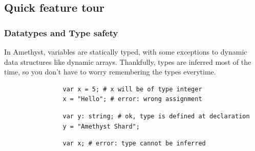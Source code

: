 \documentclass[12pt]{article}
\begin{document}
    \subsection{Quick feature tour}
        \subsubsection{Datatypes and Type safety}
            In Amethyst, variables are statically typed, with some exceptions to dynamic data structures like dynamic arrays. Thankfully, types are inferred most of the time, so you don't have to worry remembering the types everytime.
            
            \begin{lstlisting}
                var x = 5; # x will be of type integer
                x = "Hello"; # error: wrong assignment
            \end{lstlisting}
            
            \begin{lstlisting}
                var y: string; # ok, type is defined at declaration
                y = "Amethyst Shard";
            \end{lstlisting}
            
            \begin{lstlisting}
                var x; # error: type cannot be inferred
            \end{lstlisting}
                
\end{document}
